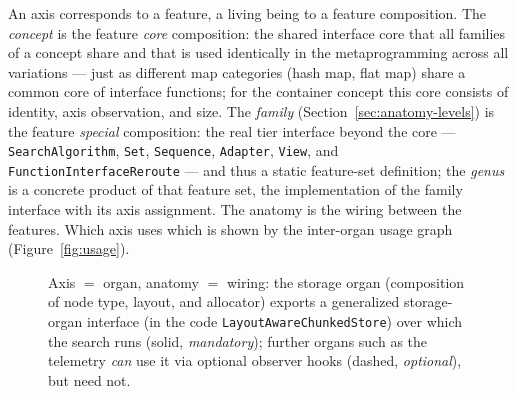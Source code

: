\begin{nurlang}
An axis corresponds to a feature, a living being to a feature composition. The \emph{concept} is the
feature \emph{core} composition: the shared interface core that all families of a concept share and
that is used identically in the metaprogramming across all variations --- just as different
map categories (hash map, flat map) share a common core of interface functions; for the
container concept this core consists of identity, axis observation, and size. The \emph{family}
(Section~\ref{sec:anatomy-levels}) is the feature \emph{special} composition:
the real tier interface beyond the core --- \texttt{SearchAlgorithm}, \texttt{Set},
\texttt{Sequence}, \texttt{Adapter}, \texttt{View}, and \texttt{FunctionInterfaceReroute} --- and thus
a static feature-set definition; the \emph{genus} is a concrete product of that feature set, the
implementation of the family interface with its axis assignment. The anatomy is the wiring between the features. Which
axis uses which is shown by the inter-organ usage graph (Figure~\ref{fig:usage}).
\begin{figure}[htbp]\centering
{}
\caption{Axis $=$ organ, anatomy $=$ wiring: the storage organ (composition of node type, layout, and allocator) exports a generalized storage-organ interface (in the code \texttt{LayoutAwareChunkedStore}) over which the search runs (solid, \emph{mandatory}); further organs such as the telemetry \emph{can} use it via optional observer hooks (dashed, \emph{optional}), but need not.}\label{fig:axis-organ}
\end{figure}
\end{nurlang}

